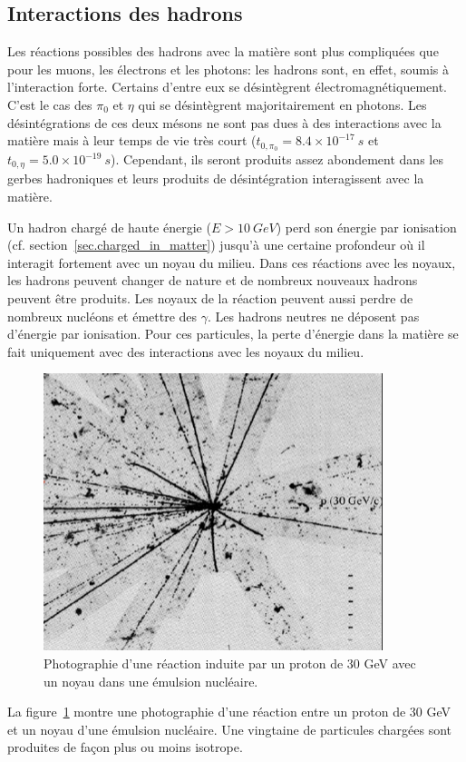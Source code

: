 \subsection{Interactions des hadrons}
Les réactions possibles des hadrons avec la matière sont plus compliquées que pour les muons, les électrons et les photons: les hadrons sont, en effet, soumis à l'interaction forte. Certains d'entre eux se désintègrent électromagnétiquement. C'est le cas des $\pi_0$ et $\eta$ qui se désintègrent majoritairement en photons. Les désintégrations de ces deux mésons ne sont pas dues à des interactions avec la matière mais à leur temps de vie très court ($t_{0,\pi_0}=8.4\times 10^{-17}\ s$ et $t_{0,\eta}=5.0\times 10^{-19}\ s$). Cependant, ils seront produits assez abondement dans les gerbes hadroniques et leurs produits de désintégration interagissent avec la matière. 

Un hadron chargé de haute énergie ($E>10\ GeV$) perd son énergie par ionisation (cf. section~\ref{sec.charged_in_matter}) jusqu'à une certaine profondeur où il interagit fortement avec un noyau du milieu. Dans ces réactions avec les noyaux, les hadrons peuvent changer de nature et de nombreux nouveaux hadrons peuvent être produits. Les noyaux de la réaction peuvent aussi perdre de nombreux nucléons et émettre des $\gamma$. Les hadrons neutres ne déposent pas d'énergie par ionisation. Pour ces particules, la perte d'énergie dans la matière se fait uniquement avec des interactions avec les noyaux du milieu. 

\begin{figure}[!h]
  \begin{center}
    \includegraphics[width=.6\textwidth]{ShowerTh/figs/nuclear_reaction_emulsion.png}
    \caption{Photographie d'une réaction induite par un proton de 30 GeV avec un noyau dans une émulsion nucléaire.}
    \label{fig:hadron_nucleus_interaction}
  \end{center}
\end{figure}
La figure~\ref{fig:hadron_nucleus_interaction} montre une photographie d'une réaction entre un proton de 30 GeV et un noyau d'une émulsion nucléaire. Une vingtaine de particules chargées sont produites de façon plus ou moins isotrope. 

